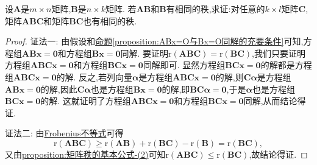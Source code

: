 \documentclass[../../main.tex]{subfiles}%
\begin{document}
\begin{proposition}\label{proposition:r(AB)=r(B)可推出r(ABC)=r(BC)}
设\(\boldsymbol{A}\)是\(m\times n\)矩阵,\(\boldsymbol{B}\)是\(n\times k\)矩阵. 若\(\boldsymbol{A}\boldsymbol{B}\)和\(\boldsymbol{B}\)有相同的秩,求证:对任意的\(k\times l\)矩阵\(\boldsymbol{C}\),矩阵\(\boldsymbol{A}\boldsymbol{B}\boldsymbol{C}\)和矩阵\(\boldsymbol{B}\boldsymbol{C}\)也有相同的秩.
\end{proposition}
\begin{proof}

{\color{blue}证法一:}
由假设和\hyperref[proposition:ABx=O与Bx=O同解的充要条件]{命题\ref{proposition:ABx=O与Bx=O同解的充要条件}}可知,方程组\(\boldsymbol{A}\boldsymbol{B}\boldsymbol{x}=\boldsymbol{0}\)和方程组\(\boldsymbol{B}\boldsymbol{x}=\boldsymbol{0}\)同解. 要证明\(\mathrm{r}(\boldsymbol{A}\boldsymbol{B}\boldsymbol{C})=\mathrm{r}(\boldsymbol{B}\boldsymbol{C})\),我们只要证明方程组\(\boldsymbol{A}\boldsymbol{B}\boldsymbol{C}\boldsymbol{x}=\boldsymbol{0}\)和方程组\(\boldsymbol{B}\boldsymbol{C}\boldsymbol{x}=\boldsymbol{0}\)同解即可. 显然方程组\(\boldsymbol{B}\boldsymbol{C}\boldsymbol{x}=\boldsymbol{0}\)的解都是方程组\(\boldsymbol{A}\boldsymbol{B}\boldsymbol{C}\boldsymbol{x}=\boldsymbol{0}\)的解. 反之,若列向量\(\boldsymbol{\alpha}\)是方程组\(\boldsymbol{A}\boldsymbol{B}\boldsymbol{C}\boldsymbol{x}=\boldsymbol{0}\)的解,则\(\boldsymbol{C}\boldsymbol{\alpha}\)是方程组\(\boldsymbol{A}\boldsymbol{B}\boldsymbol{x}=\boldsymbol{0}\)的解,因此\(\boldsymbol{C}\boldsymbol{\alpha}\)也是方程组\(\boldsymbol{B}\boldsymbol{x}=\boldsymbol{0}\)的解,即\(\boldsymbol{B}\boldsymbol{C}\boldsymbol{\alpha}=\boldsymbol{0}\),于是\(\boldsymbol{\alpha}\)也是方程组\(\boldsymbol{B}\boldsymbol{C}\boldsymbol{x}=\boldsymbol{0}\)的解. 这就证明了方程组\(\boldsymbol{A}\boldsymbol{B}\boldsymbol{C}\boldsymbol{x}=\boldsymbol{0}\)和方程组\(\boldsymbol{B}\boldsymbol{C}\boldsymbol{x}=\boldsymbol{0}\)同解,从而结论得证.

{\color{blue}证法二:}
由\hyperref[proposition:Frobenius(弗罗贝尼乌斯)不等式]{Frobenius不等式}可得
\[
\mathrm{r}(\boldsymbol{A}\boldsymbol{B}\boldsymbol{C})\geqslant \mathrm{r}(\boldsymbol{A}\boldsymbol{B})+\mathrm{r}(\boldsymbol{B}\boldsymbol{C})-\mathrm{r}(\boldsymbol{B})=\mathrm{r}(\boldsymbol{B}\boldsymbol{C}),
\]
又由\hyperref[proposition:矩阵秩的基本公式-2]{proposition:矩阵秩的基本公式-(2)}可知\(\mathrm{r}(\boldsymbol{A}\boldsymbol{B}\boldsymbol{C})\leqslant \mathrm{r}(\boldsymbol{B}\boldsymbol{C})\),故结论得证.
\end{proof}
\end{document}
